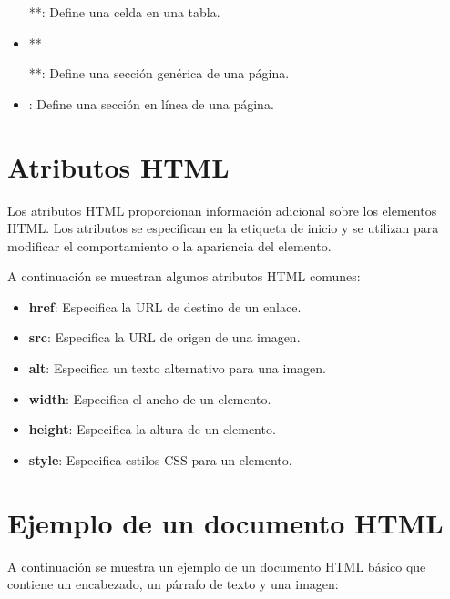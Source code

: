 \documentclass[
  a4paper,
  DIV=11,
  numbers=noendperiod,
  onepage,
  openany]{scrreprt}
\providecommand{\tightlist}{%
  \setlength{\itemsep}{0pt}\setlength{\parskip}{0pt}}\usepackage{longtable,booktabs,array}
\begin{document}
\begin{tcolorbox}
\begin{itemize}
  **: Define una celda en una tabla.
\item
  **

  **: Define una sección genérica de una página.
\item
  \textbf{}: Define una sección en línea de una página.
\end{itemize}

\section{Atributos HTML}\label{atributos-html}

Los atributos HTML proporcionan información adicional sobre los
elementos HTML. Los atributos se especifican en la etiqueta de inicio y
se utilizan para modificar el comportamiento o la apariencia del
elemento.

A continuación se muestran algunos atributos HTML comunes:

\begin{itemize}
\tightlist
\item
  \textbf{href}: Especifica la URL de destino de un enlace.
\item
  \textbf{src}: Especifica la URL de origen de una imagen.
\item
  \textbf{alt}: Especifica un texto alternativo para una imagen.
\item
  \textbf{width}: Especifica el ancho de un elemento.
\item
  \textbf{height}: Especifica la altura de un elemento.
\item
  \textbf{style}: Especifica estilos CSS para un elemento.
\end{itemize}

\section{Ejemplo de un documento
HTML}\label{ejemplo-de-un-documento-html}

A continuación se muestra un ejemplo de un documento HTML básico que
contiene un encabezado, un párrafo de texto y una imagen:


\end{tcolorbox}
\end{document}
